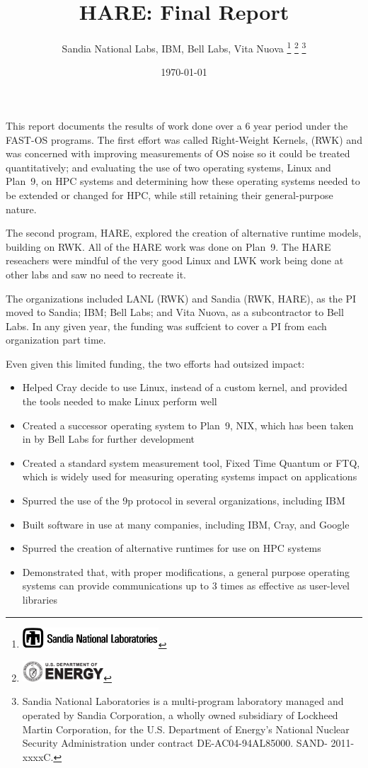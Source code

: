 \documentclass{report}
\title{HARE: Final Report}
\author{Sandia National Labs, IBM, Bell Labs, Vita Nuova
\thanks{\protect\includegraphics[height=0.3in]{thunderchicken}
}
\thanks{\protect
\includegraphics[height=0.3in]{DOELOGO}%
}%
\thanks{Sandia National Laboratories is a multi-program laboratory managed and operated by Sandia Corporation, a wholly owned subsidiary of Lockheed Martin Corporation, for the U.S. Department of Energy’s National Nuclear Security Administration under contract DE-AC04-94AL85000. SAND- 2011-xxxxC.}  
}
\date{\today}
\begin{document}
\maketitle
\tableofcontents
\pagebreak

This report documents the results of work done over a 6 year period under the FAST-OS 
programs. The first effort was called Right-Weight Kernels, (RWK) and was concerned with 
improving measurements of OS noise so it could be treated quantitatively; 
and evaluating the use of two operating systems, Linux
and Plan~9, on HPC systems and determining how these operating systems needed
to be extended or changed for HPC, while still retaining their general-purpose nature. 

The second program, HARE, explored the creation of alternative runtime models, 
building on RWK. All of the HARE work was done on Plan~9. The HARE reseachers
were mindful of the very good Linux and LWK work being done at other labs and saw no
need to recreate it. 

The organizations included LANL (RWK) and Sandia (RWK, HARE), as the PI moved to Sandia; 
IBM; Bell Labs; and Vita Nuova, as a subcontractor to Bell Labs. In any given year, 
the funding was suffcient to cover a PI from each organization part time. 

Even given this limited funding, the two efforts had outsized impact: 
\begin{itemize}
\item Helped Cray decide to use Linux, instead of a custom kernel, and provided
the tools needed to make Linux perform well
\item Created a successor operating system to Plan~9, NIX, which has been taken in 
by Bell Labs for further development
\item Created a standard system measurement tool, Fixed Time Quantum or FTQ, which is widely
used for measuring operating systems impact on applications
\item Spurred the use of the 9p protocol in several organizations, including IBM
\item Built software in use at many companies, including IBM, Cray, and Google
\item Spurred the creation of alternative runtimes for use on HPC systems
\item Demonstrated that, with proper modifications, a general purpose operating systems
can provide communications up to 3 times as effective as user-level libraries
\end{itemize}
\end{document}
